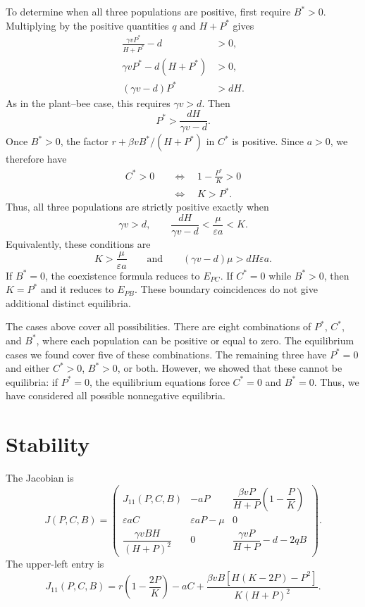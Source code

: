\documentclass[11pt]{article}
\begin{document}
To determine when all three populations are positive, first require $B^*>0$.
Multiplying by the positive quantities $q$ and $H+P^*$ gives
\begin{align*}
    \frac{\gamma vP^*}{H+P^*}-d &> 0, \\
    \gamma vP^*-d(H+P^*) &> 0, \\
    (\gamma v-d)P^* &> dH.
\end{align*}
As in the plant--bee case, this requires $\gamma v>d$. Then
\[
    P^*>\frac{dH}{\gamma v-d}.
\]
Once $B^*>0$, the factor $r+\beta vB^*/(H+P^*)$ in $C^*$ is positive.
Since $a>0$, we therefore have
\begin{align*}
    C^*>0
    &\quad\Longleftrightarrow\quad
    1-\frac{P^*}{K}>0 \\
    &\quad\Longleftrightarrow\quad K>P^*.
\end{align*}
Thus, all three populations are strictly positive exactly when
\begin{equation}
    \gamma v>d,
    \qquad
    \frac{dH}{\gamma v-d}
    <\frac{\mu}{\varepsilon a}<K.
\end{equation}
Equivalently, these conditions are
\[
    K>\frac{\mu}{\varepsilon a}
    \qquad\text{and}\qquad
    (\gamma v-d)\mu>dH\varepsilon a.
\]
If $B^*=0$, the coexistence formula reduces to $E_{PC}$.
If $C^*=0$ while $B^*>0$, then $K=P^*$ and it reduces to $E_{PB}$.
These boundary coincidences do not give additional distinct equilibria.


The cases above cover all possibilities. There are eight combinations of
$P^*$, $C^*$, and $B^*$, where each population can be positive or equal to
zero. The equilibrium cases we found cover five of these combinations. The remaining three
have $P^*=0$ and either $C^*>0$, $B^*>0$, or both. However, we showed that
these cannot be equilibria: if $P^*=0$, the equilibrium equations force
$C^*=0$ and $B^*=0$. Thus, we have considered all possible nonnegative
equilibria.

\clearpage
\section{Stability}

The Jacobian is
\begin{equation}
    J(P,C,B)=
    \begin{pmatrix}
        J_{11}(P,C,B)
        & -aP
        & \dfrac{\beta vP}{H+P}\left(1-\dfrac{P}{K}\right) \\[12pt]
        \varepsilon aC
        & \varepsilon aP-\mu
        & 0 \\[12pt]
        \dfrac{\gamma vBH}{(H+P)^2}
        & 0
        & \dfrac{\gamma vP}{H+P}-d-2qB
    \end{pmatrix}.
    \label{eq:general-jacobian}
\end{equation}
The upper-left entry is
\[
    J_{11}(P,C,B)
    =r\left(1-\frac{2P}{K}\right)-aC
    +\frac{\beta vB\left[H(K-2P)-P^2\right]}{K(H+P)^2}.
\]
\end{document}
